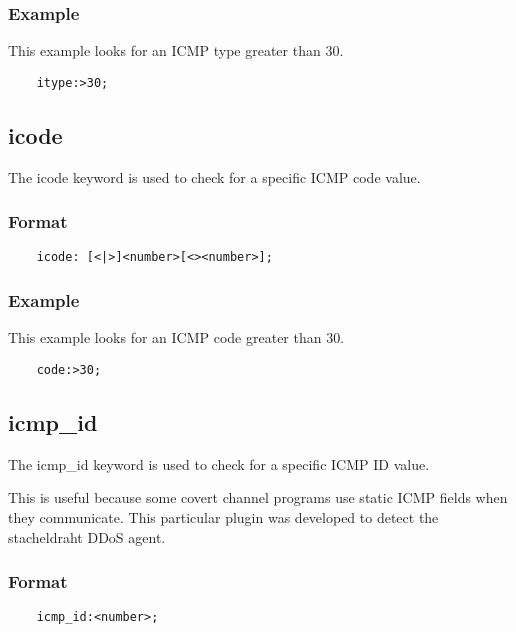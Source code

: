 \documentclass[english]{report}
\begin{document}
\subsubsection{Example}

This example looks for an ICMP type greater than 30.

\begin{verbatim}
    itype:>30;
\end{verbatim}

\subsection{icode}

The icode keyword is used to check for a specific ICMP code value.

\subsubsection{Format}

\begin{verbatim}
    icode: [<|>]<number>[<><number>];
\end{verbatim}

\subsubsection{Example}

This example looks for an ICMP code greater than 30.

\begin{verbatim}
    code:>30;
\end{verbatim}

\subsection{icmp\_id}

The icmp\_id keyword is used to check for a specific ICMP ID value.

This is useful because some covert channel programs use static ICMP fields when
they communicate.  This particular plugin was developed to detect the
stacheldraht DDoS agent.

\subsubsection{Format}

\begin{verbatim}
    icmp_id:<number>;
\end{verbatim}
\end{document}
